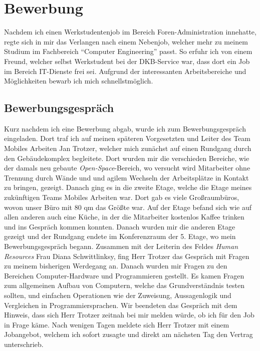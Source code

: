 \section{Bewerbung}
\label{sec:Bewerbung}

Nachdem ich einen Werkstudentenjob im Bereich Foren-Administration innehatte, regte sich in mir das Verlangen nach einem Nebenjob, welcher mehr zu meinem Studium im Fachbereich “Computer Engineering” passt. So erfuhr ich von einem Freund, welcher selbst Werkstudent bei der DKB-Service war, dass dort ein Job im Bereich IT-Dienste frei sei. 
Aufgrund der interessanten Arbeitsbereiche und Möglichkeiten bewarb ich mich schnellstmöglich.

\subsection{Bewerbungsgespräch}
\label{sec:Bewerbungsgespräch}

Kurz nachdem ich eine Bewerbung abgab, wurde ich zum Bewerbungsgespräch eingeladen. Dort traf ich auf meinen späteren Vorgesetzten und Leiter des Team Mobiles Arbeiten Jan Trotzer, welcher mich zunächst auf einen Rundgang durch den Gebäudekomplex begleitete. Dort wurden mir die verschieden Bereiche, wie der damals neu gebaute \textit{Open-Space}-Bereich, wo versucht wird Mitarbeiter ohne Trennung durch Wände und und agilem Wechseln der Arbeitsplätze in Kontakt zu bringen, gezeigt. Danach ging es in die zweite Etage, welche die Etage meines zukünftigen Teams Mobiles Arbeiten war. Dort gab es viele Großraumbüros, wovon unser Büro mit 80 qm das Größte war. Auf der Etage befand sich wie auf allen anderen auch eine Küche, in der die Mitarbeiter kostenlos Kaffee trinken und ins Gespräch kommen konnten. Danach wurden mir die anderen Etage gezeigt und der Rundgang endete im Konferenzraum der 5. Etage, wo mein Bewerbungsgespräch begann. Zusammen mit der Leiterin des Feldes \textit{Human Resources} Frau Diana Schwittlinksy, fing Herr Trotzer das Gespräch mit Fragen zu meinem bisherigen Werdegang an. Danach wurden mir Fragen zu den Bereichen Computer-Hardware und Programmieren gestellt. Es kamen Fragen zum allgemeinen Aufbau von Computern, welche das Grundverständnis testen sollten, und einfachen Operationen wie der Zuweisung, Aussagenlogik und Vergleichen in Programmiersprachen. Wir beendeten das Gespräch mit dem Hinweis, dass sich Herr Trotzer zeitnah bei mir melden würde, ob ich für den Job in Frage käme. Nach wenigen Tagen meldete sich Herr Trotzer mit einem Jobangebot, welchem ich sofort zusagte und direkt am nächsten Tag den Vertrag unterschrieb. 


